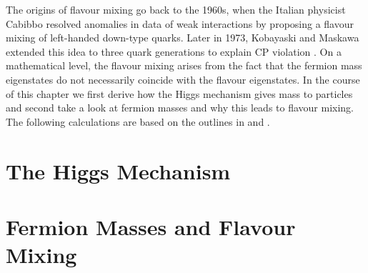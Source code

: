 The origins of flavour mixing go back to the 1960s, when the Italian physicist Cabibbo resolved anomalies in data of weak interactions by proposing a flavour mixing of left-handed down-type quarks. Later in 1973, Kobayaski and Maskawa extended this idea to three quark generations to explain CP violation \cite{Griffiths}. On a mathematical level, the flavour mixing arises from the fact that the fermion mass eigenstates do not necessarily coincide with the flavour eigenstates. In the course of this chapter we first derive how the Higgs mechanism gives mass to particles and second take a look at fermion masses and why this leads to flavour mixing. The following calculations are based on the outlines in \cite[Chapter 20]{Peskin} and \cite[Chapter 1.2.1]{Tevatron}.



\section{The Higgs Mechanism}

\section{Fermion Masses and Flavour Mixing}
